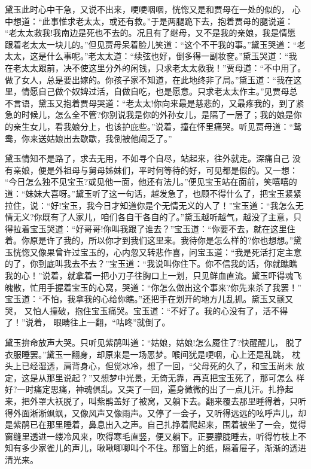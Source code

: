 黛玉此时心中干急，又说不出来，哽哽咽咽，恍惚又是和贾母在一处的似的，
心中想道：“此事惟求老太太，或还有救。”于是两腿跪下去，抱着贾母的腿说道：
“老太太救我!我南边是死也不去的。况且有了继母，又不是我的亲娘，我是情愿
跟着老太太一块儿的。”但见贾母呆着脸儿笑道：“这个不干我的事。”黛玉哭道：“老
太太，这是什么事呢。”老太太道：“续弦也好，倒多得一副妆奁。”黛玉哭道：“我
在老太太跟前，决不使这里分外的闲钱，只求老太太救我！”贾母道：“不中用了。
做了女人，总是要出嫁的。你孩子家不知道，在此地终非了局。”黛玉道：“我在这
里，情愿自己做个奴婢过活，自做自吃，也是愿意。只求老太太作主。”见贾母总
不言语，黛玉又抱着贾母哭道：“老太太!你向来最是慈悲的，又最疼我的，到了紧
急的时候儿，怎么全不管?你别说我是你的外孙女儿，是隔了一层了；我的娘是你
的亲生女儿，看我娘分上，也该护庇些。”说着，撞在怀里痛哭。听见贾母道：“鸳
鸯，你来送姑娘出去歇歇，我倒被他闹乏了。”

黛玉情知不是路了，求去无用，不如寻个自尽，站起来，往外就走。深痛自己
没有亲娘，便是外祖母与舅母姊妹们，平时何等待的好，可见都是假的。又一想：
“今日怎么独不见宝玉?或见他一面，他还有法儿。”便见宝玉站在面前，笑嘻嘻的
道：“妹妹大喜呀。”黛玉听了这一句话，越发急了，也顾不得什么了，把宝玉紧紧
拉住，说：“好!宝玉，我今日才知道你是个无情无义的人了！”宝玉道：“我怎么无
情无义?你既有了人家儿，咱们各自干各自的了。”黛玉越听越气，越没了主意，只
得拉着宝玉哭道：“好哥哥!你叫我跟了谁去？”宝玉道：“你要不去，就在这里住
着。你原是许了我的，所以你才到我们这里来。我待你是怎么样的?你也想想。”黛
玉恍惚又像果曾许过宝玉的，心内忽又转悲作喜，问宝玉道：“我是死活打定主意
的了，你到底叫我去不去？”宝玉道：“我说叫你住下。你不信我的话，你就瞧瞧
我的心！”说着，就拿着一把小刀子往胸口上一划，只见鲜血直流。黛玉吓得魂飞
魄散，忙用手握着宝玉的心窝，哭道：“你怎么做出这个事来?你先来杀了我罢！”
宝玉道：“不怕，我拿我的心给你瞧。”还把手在划开的地方儿乱抓。黛玉又颤又哭，
又怕人撞破，抱住宝玉痛哭。宝玉道：“不好了。我的心没有了，活不得了！”说着，
眼睛往上一翻，“咕咚”就倒了。

黛玉拚命放声大哭。只听见紫鹃叫道：“姑娘，姑娘!怎么魇住了?快醒醒儿，
脱了衣服睡罢。”黛玉一翻身，却原来是一场恶梦。喉间犹是哽咽，心上还是乱跳，
枕头上已经湿透，肩背身心，但觉冰冷，想了一回，“父母死的久了，和宝玉尚未
放定，这是从那里说起？”又想梦中光景，无倚无靠，再真把宝玉死了，那可怎么
样好?一时痛定思痛，神魂俱乱。又哭了一回，遍身微微的出了一点儿汗。扎挣起
来，把外罩大袄脱了，叫紫鹃盖好了被窝，又躺下去。翻来覆去那里睡得着，只听
得外面淅淅飒飒，又像风声又像雨声。又停了一会子，又听得远远的吆呼声儿，却
是紫鹃已在那里睡着，鼻息出入之声。自己扎挣着爬起来，围着被坐了一会，觉得
窗缝里透进一缕冷风来，吹得寒毛直竖，便又躺下。正要朦胧睡去，听得竹枝上不
知有多少家雀儿的声儿，啾啾唧唧叫个不住。那窗上的纸，隔着屉子，渐渐的透进
清光来。

